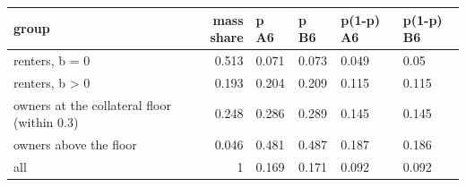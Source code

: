 \begingroup\small
\setlength{\tabcolsep}{3pt}
\renewcommand{\arraystretch}{1.04}
\begin{tabularx}{\linewidth}{XrXXXX}
\toprule
group & mass share & p A6 & p B6 & p(1-p) A6 & p(1-p) B6 \\
\midrule
renters, b = 0 & 0.513 & 0.071 & 0.073 & 0.049 & 0.05 \\
renters, b \textgreater{} 0 & 0.193 & 0.204 & 0.209 & 0.115 & 0.115 \\
owners at the collateral floor (within 0.3) & 0.248 & 0.286 & 0.289 & 0.145 & 0.145 \\
owners above the floor & 0.046 & 0.481 & 0.487 & 0.187 & 0.186 \\
all & 1 & 0.169 & 0.171 & 0.092 & 0.092 \\
\bottomrule
\end{tabularx}
\endgroup
